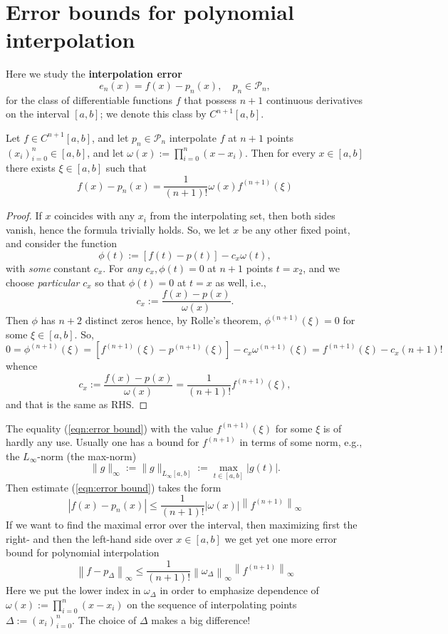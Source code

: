 \documentclass[a4paper]{article}
\begin{document}
\section{Error bounds for polynomial interpolation}
Here we study the \textbf{interpolation error}
\[
    e_n(x) = f(x) - p_n(x),\quad p_n\in \mathcal{P}_n,
\]
for the class of differentiable functions $f$ that possess $n+1$ continuous derivatives on the interval $[a,b]$; we denote this class by $C^{n+1}[a,b]$. 
\begin{theorem}
    Let $f \in C^{n+1}[a, b]$, and let $p_n \in \mathcal{P}_n$ interpolate $f$ at $n+1$ points $\left(x_i\right)_{i=0}^n \in[a, b]$, and let $\omega(x):=\prod_{i=0}^n\left(x-x_i\right)$. Then for every $x \in[a, b]$ there exists $\xi \in[a, b]$ such that
    \begin{equation}\label{eqn:error bound}
        f(x)-p_n(x)=\frac{1}{(n+1) !} \omega(x) f^{(n+1)}(\xi)
    \end{equation}
\end{theorem} 
\begin{proof}
    If $x$ coincides with any $x_i$ from the interpolating set, then both sides vanish, hence the formula trivially holds. So, we let $x$ be any other fixed point, and consider the function
    \[
    \phi(t):=[f(t)-p(t)]-c_x \omega(t),
    \]
    with \textit{some} constant $c_x$. For \textit{any} $c_x, \phi(t)=0$ at $n+1$ points $t=x_2$, and we choose \textit{particular} $c_x$ so that $\phi(t)=0$ at $t=x$ as well, i.e.,
    \[
    c_x:=\frac{f(x)-p(x)}{\omega(x)} .
    \]
    Then $\phi$ has $n+2$ distinct zeros hence, by Rolle's theorem, $\phi^{(n+1)}(\xi)=0$ for some $\xi \in[a, b]$. So,
    \[
    0=\phi^{(n+1)}(\xi)=\left[f^{(n+1)}(\xi)-p^{(n+1)}(\xi)\right]-c_x \omega^{(n+1)}(\xi)=f^{(n+1)}(\xi)-c_x(n+1) !
    \]
    whence
    \[
    c_x:=\frac{f(x)-p(x)}{\omega(x)}=\frac{1}{(n+1) !} f^{(n+1)}(\xi),
    \]
    and that is the same as RHS.
\end{proof}

The equality (\ref{eqn:error bound}) with the value $f^{(n+1)}(\xi)$ for some $\xi$ is of hardly any use. Usually one has a bound for $f^{(n+1)}$ in terms of some norm, e.g., the $L_{\infty}$-norm (the max-norm)
\[
\|g\|_{\infty}:=\|g\|_{L_{\infty}[a, b]}:=\max _{t \in[a, b]}|g(t)| .
\]
Then estimate (\ref{eqn:error bound}) takes the form
\begin{equation}\label{eqn:2.2}
    \left|f(x)-p_n(x)\right| \leq \frac{1}{(n+1) !}|\omega(x)|\left\|f^{(n+1)}\right\|_{\infty}
\end{equation}
If we want to find the maximal error over the interval, then maximizing first the right- and then the left-hand side over $x \in[a, b]$ we get yet one more error bound for polynomial interpolation
\begin{equation}\label{eqn:2.3}
    \left\|f-p_{\Delta}\right\|_{\infty} \leq \frac{1}{(n+1) !}\left\|\omega_{\Delta}\right\|_{\infty}\left\|f^{(n+1)}\right\|_{\infty}
\end{equation}
Here we put the lower index in $\omega_{\Delta}$ in order to emphasize dependence of $\omega(x):=\prod_{i=0}^n\left(x-x_i\right)$ on the sequence of interpolating points $\Delta:=\left(x_i\right)_{i=0}^n$. The choice of $\Delta$ makes a big difference!
\end{document}
